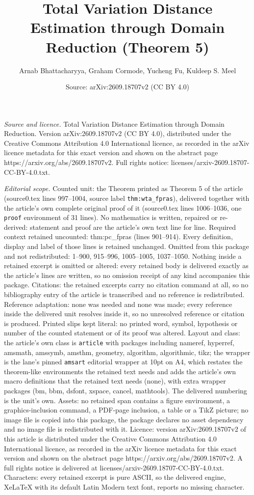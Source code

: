 \documentclass[10pt,a4paper]{amsart}
\title[Total Variation Distance Estimation through Domain Reduction]{Total Variation Distance Estimation through Domain Reduction (Theorem 5)}
\author{Arnab Bhattacharyya, Graham Cormode, Yucheng Fu, Kuldeep S. Meel}
\date{Source: arXiv:2609.18707v2 (CC BY 4.0)}
\begin{document}
\maketitle

\noindent\emph{Source and licence.} Total Variation Distance Estimation through Domain Reduction. Version arXiv:2609.18707v2 (CC BY 4.0), distributed under the Creative Commons Attribution 4.0 International licence, as recorded in the arXiv licence metadata for this exact version and shown on the abstract page https://arxiv.org/abs/2609.18707v2. Full rights notice: licenses/arxiv-2609.18707-CC-BY-4.0.txt.\par\smallskip

\noindent\textit{Editorial scope.} Counted unit: the Theorem printed as Theorem 5 of the article (source0.tex lines 997--1004, source label \texttt{thm:wta\_fpras}), delivered together with the article's own complete original proof of it (source0.tex lines 1006--1036, one \texttt{proof} environment of 31 lines). No mathematics is written, repaired or re-derived: statement and proof are the article's own text line for line. Required context retained uncounted: thm:pc\_fpras (lines 901--914). Every definition, display and label of those lines is retained unchanged. Omitted from this package and not redistributed: 1--900, 915--996, 1005--1005, 1037--1050. Nothing inside a retained excerpt is omitted or altered: every retained body is delivered exactly as the article's lines are written, so no omission receipt of any kind accompanies this package. Citations: the retained excerpts carry no citation command at all, so no bibliography entry of the article is transcribed and no reference is redistributed. Reference adaptation: none was needed and none was made; every reference inside the delivered unit resolves inside it, so no unresolved reference or citation is produced. Printed slips kept literal: no printed word, symbol, hypothesis or number of the counted statement or of its proof was altered. Layout and class: the article's own class is \texttt{article} with packages including nameref, hyperref, amsmath, amssymb, amsthm, geometry, algorithm, algorithmic, tikz; the wrapper is the lane's pinned \texttt{amsart} editorial wrapper at 10pt on A4, which restates the theorem-like environments the retained text needs and adds the article's own macro definitions that the retained text needs (none), with extra wrapper packages (bm, bbm, dsfont, xspace, cancel, mathtools). The delivered numbering is the unit's own. Assets: no retained span contains a figure environment, a graphics-inclusion command, a PDF-page inclusion, a table or a TikZ picture; no image file is copied into this package, the package declares no asset dependency and no image file is redistributed with it. Licence: version arXiv:2609.18707v2 of this article is distributed under the Creative Commons Attribution 4.0 International licence, as recorded in the arXiv licence metadata for this exact version and shown on the abstract page https://arxiv.org/abs/2609.18707v2. A full rights notice is delivered at licenses/arxiv-2609.18707-CC-BY-4.0.txt. Characters: every retained excerpt is pure ASCII, so the delivered engine, XeLaTeX with its default Latin Modern text font, reports no missing character.
\end{document}
